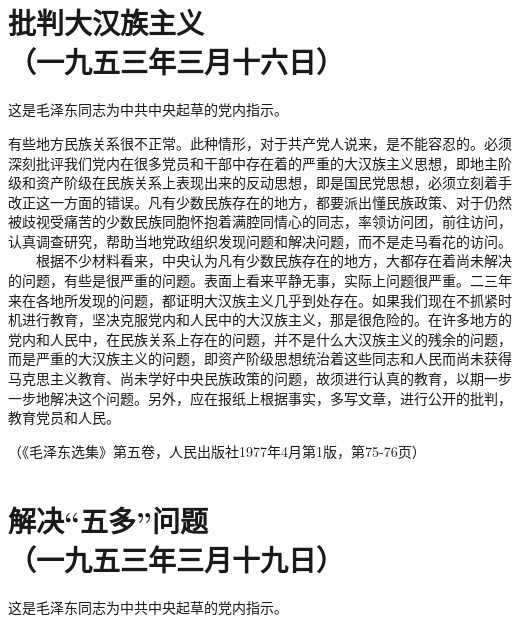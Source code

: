 \documentclass[cn,11pt,chinese]{elegantbook}
\def\myformat#1{\hfil\hfil #1}
\begin{document}
\newpage\section*{\myformat{批判大汉族主义}\\\myformat{（一九五三年三月十六日）}}
\begin{introduction}\item  这是毛泽东同志为中共中央起草的党内指示。\end{introduction}
有些地方民族关系很不正常。此种情形，对于共产党人说来，是不能容忍的。必须深刻批评我们党内在很多党员和干部中存在着的严重的大汉族主义思想，即地主阶级和资产阶级在民族关系上表现出来的反动思想，即是国民党思想，必须立刻着手改正这一方面的错误。凡有少数民族存在的地方，都要派出懂民族政策、对于仍然被歧视受痛苦的少数民族同胞怀抱着满腔同情心的同志，率领访问团，前往访问，认真调查研究，帮助当地党政组织发现问题和解决问题，而不是走马看花的访问。\\
　　根据不少材料看来，中央认为凡有少数民族存在的地方，大都存在着尚未解决的问题，有些是很严重的问题。表面上看来平静无事，实际上问题很严重。二三年来在各地所发现的问题，都证明大汉族主义几乎到处存在。如果我们现在不抓紧时机进行教育，坚决克服党内和人民中的大汉族主义，那是很危险的。在许多地方的党内和人民中，在民族关系上存在的问题，并不是什么大汉族主义的残余的问题，而是严重的大汉族主义的问题，即资产阶级思想统治着这些同志和人民而尚未获得马克思主义教育、尚未学好中央民族政策的问题，故须进行认真的教育，以期一步一步地解决这个问题。另外，应在报纸上根据事实，多写文章，进行公开的批判，教育党员和人民。\\
\begin{flushright}（《毛泽东选集》第五卷，人民出版社1977年4月第1版，第75-76页）\end{flushright}
\newpage\section*{\myformat{解决“五多”问题}\\\myformat{（一九五三年三月十九日）}}
\begin{introduction}\item  这是毛泽东同志为中共中央起草的党内指示。\end{introduction}
\end{document}
